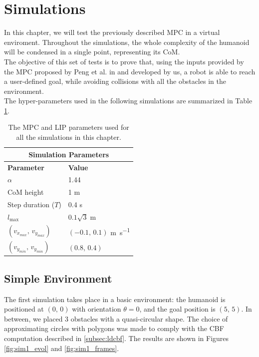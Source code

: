 \section{Simulations}\label{sec:simulations}

In this chapter, we will test the previously described MPC in a virtual enviroment. Throughout the simulations, the whole complexity of the humanoid will be condensed in a single point, representing its CoM.\\
The objective of this set of tests is to prove that, using the inputs provided by the MPC proposed by Peng et al. in \cite{peng_main_paper} and developed by us, a robot is able to reach a user-defined goal, while avoiding collisions with all the obstacles in the environment.\\
The hyper-parameters used in the following simulations are summarized in Table \ref{table:sim_params}.

\begin{table}[h]
        \begin{tabular}{ |p{4cm}||p{4cm}| }
             \hline
             \multicolumn{2}{|c|}{Simulation Parameters} \\
             \hline
             \textbf{Parameter} & \textbf{Value}\\
             \hline
             $\alpha$   & 1.44 \\
             CoM height & 1 \si{\meter} \\
             Step duration ($T$) & 0.4 \si{\second} \\
             $l_{\max}$ & $0.1 \sqrt{3} \;\si{\meter}$ \\
             $\left( v_{x_{max}},\, v_{y_{max}} \right)$ & $\left( -0.1,\, 0.1 \right)$ \si{\meter\per\second}\\
             $\left( v_{y_{min}},\, v_{y_{min}} \right)$ & $\left( 0.8,\, 0.4 \right)$ \\
             \hline
        \end{tabular}
    \centering
    \caption{The MPC and LIP parameters used for all the simulations in this chapter.}
    \label{table:sim_params}
\end{table}

\subsection{Simple Environment}
The first simulation takes place in a basic environment: the humanoid is positioned at $(0,\,0)$ with orientation $\theta = 0$, and the goal position is $(5,\,5)$. In between, we placed 3 obstacles with a quasi-circular shape. The choice of approximating circles with polygons was made to comply with the CBF computation described in \ref{subsec:ldcbf}. The results are shown in Figures \ref{fig:sim1_evol} and \ref{fig:sim1_frames}.

